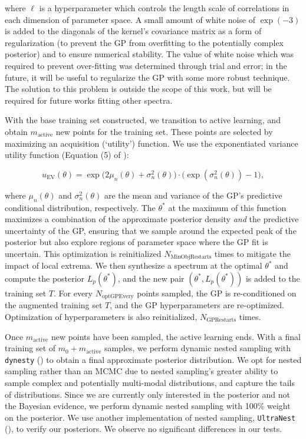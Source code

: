 \documentclass[twocolumn, twocolappendix]{aastex63}
\begin{document}
\noindent where $\ell$ is a hyperparameter which controls the length scale of correlations in each dimension of parameter space. A small amount of white noise of $\exp(-3)$ is added to the diagonals of the kernel's covariance matrix as a form of regularization (to prevent the GP from overfitting to the potentially complex posterior) and to ensure numerical stability. The value of white noise which was required to prevent over-fitting was determined through trial and error; in the future, it will be useful to regularize the GP with some more robust technique. The solution to this problem is outside the scope of this work, but will be required for future works fitting other spectra.

With the base training set constructed, we transition to active learning, and obtain $m_{\mathrm{active}}$ new points for the training set. These points are selected by maximizing an acquisition (`utility') function. We use the exponentiated variance utility function (Equation (5) of \citealt{kandasamy17}):  

\begin{equation}\label{eqn:EV_utility}
    u_{\mathrm{EV}}(\theta) = \exp\big(2\mu_n(\theta) + \sigma_n^2(\theta)\big)\cdot\big(\exp(\sigma_n^2(\theta)) - 1\big),
\end{equation}
    
\noindent where $\mu_n(\theta)$ and $\sigma_n^2(\theta)$ are the mean and variance of the GP's predictive conditional distribution, respectively. The $\theta^*$ at the maximum of this function maximizes a combination of the approximate posterior density \textit{and} the predictive uncertainty of the GP, ensuring that we sample around the expected peak of the posterior but also explore regions of parameter space where the GP fit is uncertain. This optimization is reinitialized $N_{\mathrm{MinObjRestarts}}$ times to mitigate the impact of local extrema. We then synthesize a spectrum at the optimal $\theta^*$ and compute the posterior $L_p (\theta^*)$, and the new pair $(\theta^*, L_p (\theta^*))$ is added to the training set $T$. For every $N_{\mathrm{optGPEvery}}$ points sampled, the GP is re-conditioned on the augmented training set $T$, and the GP hyperparameters are re-optimized. Optimization of hyperparameters is also reinitialized, $N_{\mathrm{GPRestarts}}$ times. 

Once $m_{\mathrm{active}}$ new points have been sampled, the active learning ends. With a final training set of $m_0 + m_{\mathrm{active}}$ samples, we perform dynamic nested sampling with \texttt{dynesty} (\citealt{speagle20}) to obtain a final approximate posterior distribution. We opt for nested sampling rather than an MCMC due to nested sampling's greater ability to sample complex and potentially multi-modal distributions, and capture the tails of distributions. Since we are currently only interested in the posterior and not the Bayesian evidence, we perform dynamic nested sampling with 100\% weight on the posterior. We use another implementation of nested sampling, \texttt{UltraNest} (\citealt{buchner21}), to verify our posteriors. We observe no significant differences in our tests.
\end{document}
